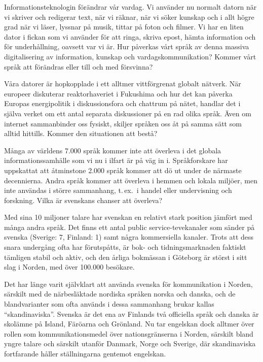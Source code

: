 \frenchspacing
\begin{multicols}{2}

Informationsteknologin förändrar vår vardag. Vi använder nu normalt
datorn när vi skriver och redigerar text, när vi räknar, när vi söker
kunskap och i allt högre grad när vi läser, lyssnar på musik, tittar
på \mbox{foton} och filmer. Vi har en liten dator i fickan som vi använder
för att ringa, skriva epost, hämta information och för underhållning,
oavsett var vi är. Hur påverkas vårt språk av denna massiva
digitalisering av information, kunskap och vardagskommunikation?
Kommer vårt språk att förändras eller till och med försvinna?

Våra datorer är hopkopplade i ett alltmer vittförgrenat globalt
nätverk. När europeer diskuterar reaktorhaveriet i Fukushima och hur
det kan på\-verka \mbox{Europas} energipolitik i diskussionsfora och chattrum
på nätet, handlar det i själva verket om ett \mbox{antal} separata
diskussioner på en rad olika språk. Även om internet sammanbinder oss
fysiskt, skiljer språken oss åt på samma sätt som alltid
hittills. Kommer den situationen att bestå?

Många av världens 7.000 språk kommer inte att överleva i det globala
informationssamhälle som vi nu i ilfart är på väg in i. Språkforskare
har uppskattat att åtminstone 2.000 språk kommer att dö ut under de
närmaste decennierna. Andra språk kommer att överleva i hemmen och
lokala miljöer, men \mbox{inte} användas i större sammanhang, t.\,ex.~i handel
\mbox{eller} under\-visning och forskning. Vilka är svenskans chanser att
överleva?

Med sina 10 miljoner talare har svenskan en relativt stark position
jämfört med många andra språk. Det finns ett antal public
service-tevekanaler som \mbox{sänder} på svenska (Sverige: 7, Finland: 1)
samt \mbox{några} kommersiella kanaler. Trots att dess snara undergång \mbox{ofta}
har förutspåtts, är bok- och tidningsmarknaden faktiskt tämligen
stabil och aktiv, och den årliga bokmässan i Göteborg är störst i sitt
slag i Norden, med över 100.000 besökare.

Det har länge varit självklart att använda svenska för kommunikation i
Norden, särskilt med de närbesläktade nordiska språken norska och
danska, och de blandvarianter som ofta används i dessa sammanhang
brukar kallas ``skandinaviska''. Svenska är det ena av Finlands två
officiella språk och danska är skolämne på Island, Färöarna och
Grönland. Nu tar engelskan dock alltmer över rollen som
kommunikationsmedel över nationsgränserna i Norden, särskilt bland
yngre talare och särskilt utanför Danmark, Norge och Sverige, där
skandinaviska fort\-farande håller ställningarna gentemot engelskan.


\end{multicols}
